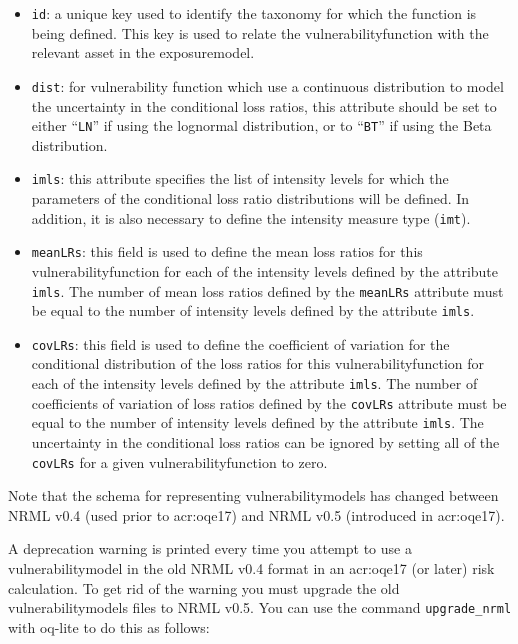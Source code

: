 \begin{itemize}

    \item \Verb+id+: a unique key used to identify the \gls{taxonomy} for 
    which the function is being defined. This key is used to relate the 
    \gls{vulnerabilityfunction} with the relevant \gls{asset} in the 
    \gls{exposuremodel}.

    \item \Verb+dist+: for vulnerability function which use a continuous 
    distribution to model the uncertainty in the conditional loss ratios, 
    this attribute should be set to either ``\Verb+LN+'' if using the lognormal
    distribution, or to ``\Verb+BT+'' if using the Beta distribution.

    \item \Verb+imls+: this attribute specifies the list of intensity levels
    for which the parameters of the conditional loss ratio distributions will
    be defined. In addition, it is also necessary to define the intensity 
    measure type (\Verb+imt+).

    \item \Verb+meanLRs+: this field is used to define the mean loss ratios
    for this \gls{vulnerabilityfunction} for each of the intensity levels
    defined by the attribute \Verb+imls+. The number of mean loss ratios
    defined by the \Verb+meanLRs+ attribute must be equal to the number of
    intensity levels defined by the attribute \Verb+imls+.

    \item \Verb+covLRs+: this field is used to define the coefficient of 
    variation for the conditional distribution of the loss ratios for this
    \gls{vulnerabilityfunction} for each of the intensity levels defined by
    the attribute \Verb+imls+. The number of coefficients of variation of loss
    ratios defined by the \Verb+covLRs+ attribute must be equal to the number
    of intensity levels defined by the attribute \Verb+imls+. The uncertainty
    in the conditional loss ratios can be ignored by setting all of the
    \Verb+covLRs+ for a given \gls{vulnerabilityfunction} to zero.

\end{itemize}


Note that the schema for representing \glspl{vulnerabilitymodel} has changed
between NRML v0.4 (used prior to \gls{acr:oqe17}) and NRML v0.5 (introduced in
\gls{acr:oqe17}).

A deprecation warning is printed every time you attempt to use a
\gls{vulnerabilitymodel} in the old NRML v0.4 format in an \gls{acr:oqe17} (or
later) risk calculation. To get rid of the warning you must upgrade the old
\glspl{vulnerabilitymodel} files to NRML v0.5. You can use the command
\Verb+upgrade_nrml+ with oq-lite to do this as follows:

